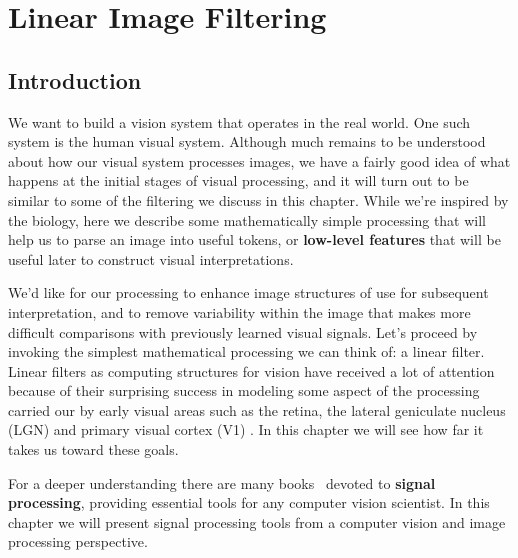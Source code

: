 \chapter{Linear Image Filtering}
\label{chapter:linear_image_filtering}

\section{Introduction}

We want to build a vision system that operates in the real
world.  One such system is the human visual system.  Although much remains to be understood about how
our visual system processes images, we have a fairly good idea of what happens at the initial stages of
visual processing, and it will turn out to be similar to some of the
filtering we discuss in this chapter.  While we're inspired by the
biology, here we describe some mathematically simple processing  that will
help us to parse an image into useful tokens, or {\bf low-level features} that
will be useful later to construct visual interpretations.

We'd like for our processing to enhance image structures of
use for subsequent interpretation, and to remove variability within
the image that makes more difficult comparisons with previously
learned visual signals.  Let's proceed by invoking the simplest mathematical
processing we can think of: a linear filter. Linear filters as computing structures for vision have received a lot of attention because of their surprising success in modeling some aspect of the processing carried our by early visual areas such as the retina, the lateral geniculate nucleus (LGN) and primary visual cortex (V1) \cite{Hubel62}. In this chapter we will see how far it takes us toward these goals.


For a deeper understanding there are many books~\cite{Oppenheim1996} devoted to {\bf signal processing},
providing essential tools for any computer vision scientist. In this chapter we will present signal processing tools from a computer vision and image processing perspective.




